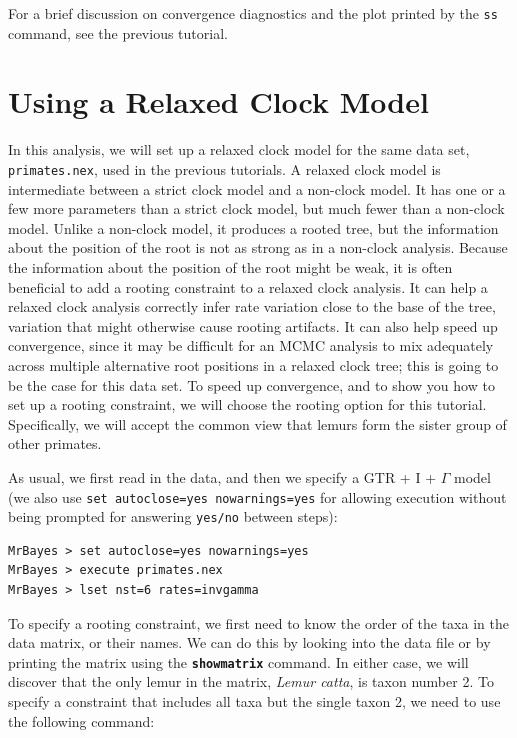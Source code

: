 \documentclass[12pt]{book}
\newcommand{\ttt}[1]{\texttt{#1}}
\newcommand{\tb}[1]{\ttt{\textbf{#1}}}
\begin{document}
For a brief discussion on convergence diagnostics and the plot printed by the \texttt{ss} command,
see the previous tutorial.

\section{Using a Relaxed Clock Model}\label{relaxedClock}

In this analysis, we will set up a relaxed clock model for the same data set,
\texttt{primates.nex}, used in the previous tutorials. A relaxed clock model is intermediate
between a strict clock model and a non-clock model. It has one or a few more parameters than a
strict clock model, but much fewer than a non-clock model. Unlike a non-clock model, it produces a
rooted tree, but the information about the position of the root is not as strong as in a non-clock
analysis. Because the information about the position of the root might be weak, it is often
beneficial to add a rooting constraint to a relaxed clock analysis. It can help a relaxed clock
analysis correctly infer rate variation close to the base of the tree, variation that might
otherwise cause rooting artifacts. It can also help speed up convergence, since it may be difficult
for an MCMC analysis to mix adequately across multiple alternative root positions in a relaxed
clock tree; this is going to be the case for this data set. To speed up convergence, and to show
you how to set up a rooting constraint, we will choose the rooting option for this tutorial.
Specifically, we will accept the common view that lemurs form the sister group of other primates.

As usual, we first read in the data, and then we specify a GTR + I + $\Gamma$ model (we also use
\texttt{set autoclose=yes nowarnings=yes} for allowing execution without being prompted for
answering \texttt{yes/no} between steps):

\begin{Verbatim}[fontsize=\small]
MrBayes > set autoclose=yes nowarnings=yes
MrBayes > execute primates.nex
MrBayes > lset nst=6 rates=invgamma
\end{Verbatim}

To specify a rooting constraint, we first need to know the order of the taxa in the data matrix, or
their names. We can do this by looking into the data file or by printing the matrix using the
\tb{showmatrix} command. In either case, we will discover that the only lemur in the matrix,
\textit{Lemur catta}, is taxon number 2. To specify a constraint that includes all taxa but the
single taxon 2, we need to use the following command:
\end{document}

